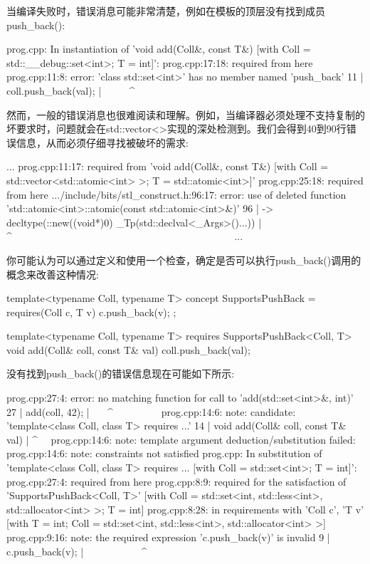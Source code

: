 当编译失败时，错误消息可能非常清楚，例如在模板的顶层没有找到成员push\_back():

{\footnotesize
\begin{shell}
prog.cpp: In instantiation of ’void add(Coll&, const T&)
             [with Coll = std::__debug::set<int>; T = int]’:
prog.cpp:17:18:     required from here
prog.cpp:11:8: error: ’class std::set<int>’ has no member named ’push_back’
  11 | coll.push_back(val);
      | ~~~~~^~~~~~~~~
\end{shell}
}

然而，一般的错误消息也很难阅读和理解。例如，当编译器必须处理不支持复制的坏要求时，问题就会在std::vector<>实现的深处检测到。我们会得到40到90行错误信息，从而必须仔细寻找被破坏的需求:

{\footnotesize
\begin{shell}
...
prog.cpp:11:17: required from ’void add(Coll&, const T&)
                    [with Coll = std::vector<std::atomic<int> >; T = std::atomic<int>]’
prog.cpp:25:18:     required from here
.../include/bits/stl_construct.h:96:17:
    error: use of deleted function
’std::atomic<int>::atomic(const std::atomic<int>&)’
    96 | -> decltype(::new((void*)0) _Tp(std::declval<_Args>()...))
        |                  ^~~~~~~~~~~~~~~~~~~~~~~~~~~~~~~~~~~~~~~~~~~~~
...
\end{shell}
}


你可能认为可以通过定义和使用一个检查，确定是否可以执行push\_back()调用的概念来改善这种情况:

\begin{cpp}
template<typename Coll, typename T>
concept SupportsPushBack = requires(Coll c, T v) {
	c.push_back(v);
};

template<typename Coll, typename T>
requires SupportsPushBack<Coll, T>
void add(Coll& coll, const T& val)
{
	coll.push_back(val);
}
\end{cpp}

没有找到push\_back()的错误信息现在可能如下所示:

{\scriptsize
\begin{shell}
prog.cpp:27:4: error: no matching function for call to ’add(std::set<int>&, int)’
    27 | add(coll, 42);
        | ~~~^~~~~~~~~~
prog.cpp:14:6: note: candidate: ’template<class Coll, class T> requires ...’
     14 | void add(Coll& coll, const T& val)
         |      ^~~
prog.cpp:14:6: note: template argument deduction/substitution failed:
prog.cpp:14:6: note: constraints not satisfied
prog.cpp: In substitution of ’template<class Coll, class T> requires ...
           [with Coll = std::set<int>; T = int]’:
prog.cpp:27:4: required from here
prog.cpp:8:9: required for the satisfaction of ’SupportsPushBack<Coll, T>’
                  [with Coll = std::set<int, std::less<int>, std::allocator<int> >; T = int]
prog.cpp:8:28: in requirements with ’Coll c’, ’T v’
                      [with T = int; Coll = std::set<int, std::less<int>, std::allocator<int> >]
prog.cpp:9:16: note: the required expression ’c.push_back(v)’ is invalid
      9 | c.push_back(v);
         | ~~~~~~~~~~~^~~
\end{shell}
}

